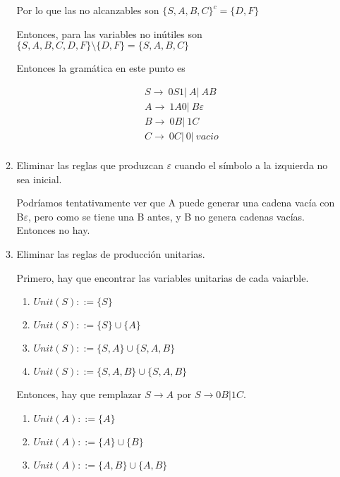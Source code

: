\documentclass{article}
\begin{document}
\begin{enumerate}
\begin{enumerate}
        Por lo que las no alcanzables son $\{S, A, B, C\}^{c} = \{D, F\}$

      

        Entonces, para las variables no inútiles son
        $\{S, A, B, C, D, F\} \setminus \{D, F\}
        = \{S, A, B, C\}$

        Entonces la gramática en este punto es 

        \begin{align*}
            &S \rightarrow \ 0S1 |\ A |\ AB \\
            &A \rightarrow \ 1A0 |\ B\varepsilon \\
            &B \rightarrow \ 0B |\ 1C \\
            &C \rightarrow \ 0C |\ 0 |\ vacio \\
        \end{align*}

        \item Eliminar las reglas que produzcan $\varepsilon$ cuando el símbolo
        a la izquierda no sea inicial.

         Podríamos tentativamente ver que A puede generar una cadena vacía con B$\varepsilon$, pero como se tiene una B antes, y B no genera cadenas vacías. Entonces no hay.

        \item Eliminar las reglas de producción unitarias.
        
        Primero, hay que encontrar las variables unitarias de cada vaiarble.
        \begin{enumerate}
            \item $Unit(S) ::= \{S\}$
            \item $Unit(S) ::= \{S\} \cup \{A\}$
            \item $Unit(S) ::= \{S, A\} \cup \{S, A, B\}$
            \item $Unit(S) ::= \{S, A, B\} \cup \{S, A, B\}$
        \end{enumerate}

        Entonces, hay que remplazar $S \rightarrow A$ por $S \rightarrow  0B| 1C$.

        \begin{enumerate}
            \item $Unit(A) ::= \{A\}$
            \item $Unit(A) ::= \{A\} \cup \{B\}$
            \item $Unit(A) ::= \{A, B\} \cup \{A, B\}$
        \end{enumerate}


\end{enumerate}
\end{enumerate}
\end{document}
